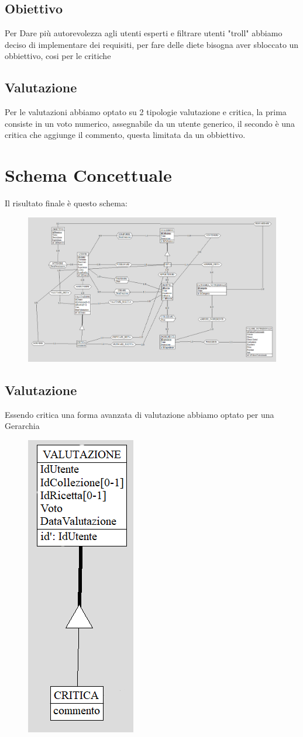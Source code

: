 ﻿\documentclass[a4paper,12pt]{report}
\begin{document}
\subsection{Obiettivo}
Per Dare più autorevolezza agli utenti esperti e
filtrare utenti "troll" abbiamo deciso di implementare dei requisiti,
per fare delle diete bisogna aver sbloccato un obbiettivo, 
cosi per le critiche
\subsection{Valutazione}
Per le valutazioni abbiamo optato su 2 tipologie
valutazione e critica, la prima consiste in un voto
numerico, assegnabile da un utente generico, il secondo è una critica
che aggiunge il commento, questa limitata da un obbiettivo.


\section{Schema Concettuale}
Il risultato finale è questo schema:
\begin{figure}[H]
    \centering
    \includegraphics[width=0.9\linewidth]{app_images/schema-concettuale.png}
\end{figure}

\subsection{Valutazione}
Essendo critica una forma avanzata di valutazione
abbiamo optato per una Gerarchia
\begin{figure}[H]
    \centering
    \includegraphics[width=0.2\linewidth]{app_images/valutazione-concettuale.png}
\end{figure}
\end{document}
